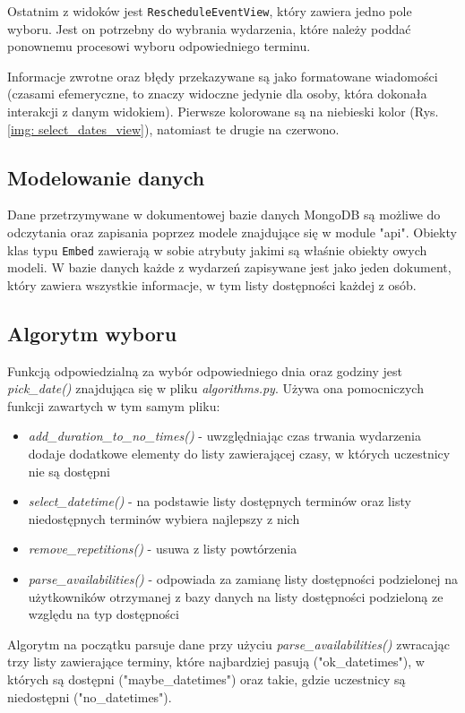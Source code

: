 \documentclass[12pt,a4paper]{article}
\newcommand{\classname}[1]{\texttt{#1}}
\begin{document}
Ostatnim z widoków jest \classname{RescheduleEventView}, który zawiera jedno pole wyboru. Jest on potrzebny do wybrania wydarzenia, które należy poddać ponownemu procesowi wyboru odpowiedniego terminu. 

Informacje zwrotne oraz błędy przekazywane są jako formatowane wiadomości (czasami efemeryczne, to znaczy widoczne jedynie dla osoby, która dokonała interakcji z danym widokiem). Pierwsze kolorowane są na niebieski kolor (Rys. \ref{img: select_dates_view}), natomiast te drugie na czerwono.

\subsection{Modelowanie danych}

Dane przetrzymywane w dokumentowej bazie danych MongoDB są możliwe do odczytania oraz zapisania poprzez modele znajdujące się w module "api". Obiekty klas typu \classname{Embed} zawierają w sobie atrybuty jakimi są właśnie obiekty owych modeli. W bazie danych każde z wydarzeń zapisywane jest jako jeden dokument, który zawiera wszystkie informacje, w tym listy dostępności każdej z osób.


\subsection{Algorytm wyboru}

Funkcją odpowiedzialną za wybór odpowiedniego dnia oraz godziny jest \textit{pick\_date()} znajdująca się w pliku \textit{algorithms.py}. Używa ona pomocniczych funkcji zawartych w tym samym pliku:
\begin{itemize}
    \item \textit{add\_duration\_to\_no\_times()} - uwzględniając czas trwania wydarzenia dodaje dodatkowe elementy do listy zawierającej czasy, w których uczestnicy nie są dostępni
    \item \textit{select\_datetime()} - na podstawie listy dostępnych terminów oraz listy niedostępnych terminów wybiera najlepszy z nich
    \item \textit{remove\_repetitions()} - usuwa z listy powtórzenia
    \item \textit{parse\_availabilities()} - odpowiada za zamianę listy dostępności podzielonej na użytkowników otrzymanej z bazy danych na listy dostępności podzieloną ze względu na typ dostępności
\end{itemize}

Algorytm na początku parsuje dane przy użyciu \textit{parse\_availabilities()} zwracając trzy listy zawierające terminy, które najbardziej pasują ("ok\_datetimes"), w których są dostępni ("maybe\_datetimes") oraz takie, gdzie uczestnicy są niedostępni ("no\_datetimes"). 
\end{document}
